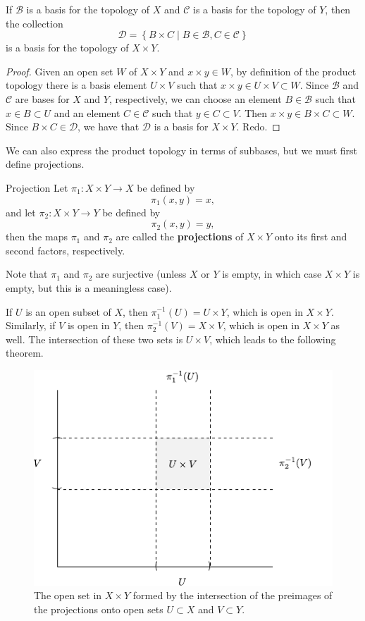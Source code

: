 \documentclass[10pt]{report}
\begin{document}
\begin{thrm}{}{}
If $\mathcal{B}$ is a basis for the topology of $X$ and $\mathcal{C}$ is a basis for the topology of $Y$, then the collection
\[
\mathcal{D}=\left\{ B\times C \;|\; B \in \mathcal{B}, C \in \mathcal{C} \right\}
\] is a basis for the topology of $X \times Y$.
\end{thrm}
\begin{proof}
	Given an open set $W$ of $X \times Y$ and $x \times y \in W$, by definition of the product topology there is a basis element $U \times V$ such that $x \times y \in U \times V \subset W$. Since $\mathcal{B}$ and $\mathcal{C}$ are bases for $X$ and $Y$, respectively, we can choose an element $B\in\mathcal{B}$ such that $x \in B \subset U$ and an element $C \in \mathcal{C}$ such that $y \in C \subset V$. Then $x \times y \in B \times C \subset W$. Since $B \times C \in \mathcal{D}$, we have that $\mathcal{D}$ is a basis for $X \times Y$. {\color{red}Redo.}
\end{proof}

We can also express the product topology in terms of subbases, but we must first define projections.

\begin{defn}{Projection}{}
Let $\pi_1: X \times Y \to X$ be defined by
\[
	\pi_1(x,y) = x,
\] and let $\pi_2:X\times Y \to Y$ be defined by
\[
	\pi_2(x,y)=y,
\] then the maps $\pi_1$ and $\pi_2$ are called the \textbf{projections} of $X \times Y$ onto its first and second factors, respectively.
\end{defn}

Note that $\pi_1$ and $\pi_2$ are surjective (unless $X$ or $Y$ is empty, in which case $X \times Y$ is empty, but this is a meaningless case).

If $U$ is an open subset of $X$, then $\pi_1^{-1}(U)=U \times Y$, which is open in $X \times Y$. Similarly, if $V$ is open in $Y$, then $\pi_2^{-1}(V) = X \times V$, which is open in $X \times Y$ as well. The intersection of these two sets is $U \times V$, which leads to the following theorem.

\begin{figure}[H]
	\centering
	\includegraphics[scale=1.5]{fig/product-open.pdf}
	\caption{The open set in $X \times Y$ formed by the intersection of the preimages of the projections onto open sets $U \subset X$ and $V \subset Y$.}
\end{figure}
\end{document}
